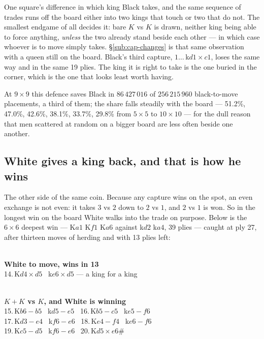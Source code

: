 \documentclass[11pt]{article}
\begin{document}
\smallskip

\noindent
One square's difference in which king Black takes, and the same sequence of
trades runs off the board either into two kings that touch or two that do not.
The smallest endgame of all decides it: bare $K$ vs $K$ is drawn, neither king
being able to force anything, \emph{unless} the two already stand beside each
other --- in which case whoever is to move simply takes.
\S\ref{sub:cap-changes} is that same observation with a queen still on the board.
Black's third capture, $1\ldots$\,k$d1\times c1$, loses the same way and in the
same 19 plies. The king it is right to take is the one buried in the corner,
which is the one that looks least worth having.

At $9\times9$ this defence saves Black in $86\,427\,016$ of $256\,215\,960$
black-to-move placements, a third of them; the share falls steadily with the
board --- 51.2\%, 47.0\%, 42.6\%, 38.1\%, 33.7\%, 29.8\% from $5\times5$ to
$10\times10$ --- for the dull reason that men scattered at random on a bigger
board are less often beside one another.

\subsection{White gives a king back, and that is how he wins}\label{sub:kings-trade}

\noindent
The other side of the same coin. Because any capture wins on the spot, an even
exchange is not even: it takes $3$ vs $2$ down to $2$ vs $1$, and $2$ vs $1$ is
won. So in the longest win on the board White walks into the trade on purpose.
Below is the $6\times6$ deepest win --- K$a1$ K$f1$ K$a6$ against k$d2$ k$a4$, 39
plies --- caught at ply 27, after thirteen moves of herding and with 13 plies
left:

\smallskip

\begin{minipage}{0.47\textwidth}\centering
  \\[1.5mm]
  {\scriptsize\color{inksoft}\textbf{White to move, wins in 13}\\
   14.\,K$d4\times d5$ \ k$e6\times d5$ --- a king for a king}
\end{minipage}\hfill
\begin{minipage}{0.47\textwidth}\centering
  \\[1.5mm]
  {\scriptsize\color{inksoft}\textbf{$K\!+\!K$ vs $K$, and White is winning}\\
   15.\,K$b6-b5$ \ k$d5-e5$ \ 16.\,K$b5-c5$ \ k$e5-f6$\\
   17.\,K$d3-e4$ \ k$f6-e6$ \ 18.\,K$e4-f4$ \ k$e6-f6$\\
   19.\,K$c5-d5$ \ k$f6-e6$ \ 20.\,K$d5\times e6$\#}
\end{minipage}
\end{document}
